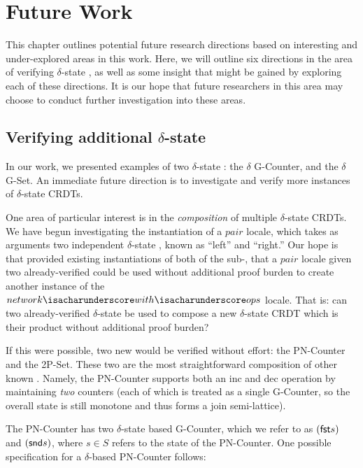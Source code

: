 \chapter{Future Work}
\label{chap:future-work}

This chapter outlines potential future research directions based on interesting
and under-explored areas in this work. Here, we will outline six directions in
the area of verifying $\delta$-state \CRDTs, as well as some insight that might
be gained by exploring each of these directions. It is our hope that future
researchers in this area may choose to conduct further investigation into these
areas.

\section{Verifying additional $\delta$-state \CRDTs}
\label{sec:future-pair-locale}
In our work, we presented examples of two $\delta$-state \CRDTs: the $\delta$
G-Counter, and the $\delta$ G-Set. An immediate future direction is to
investigate and verify more instances of $\delta$-state CRDTs.

One area of particular interest is in the \emph{composition} of multiple
$\delta$-state CRDTs. We have begun investigating the instantiation of a $pair$
locale, which takes as arguments two independent $\delta$-state \CRDTs, known as
``left'' and ``right.'' Our hope is that provided existing instantiations of
both of the sub-\CRDTs, that a $pair$ locale given two already-verified \CRDTs
could be used without additional proof burden to create another instance of the
$network{\isacharunderscore}with{\isacharunderscore}ops$ locale. That is: can
two already-verified $\delta$-state \CRDTs be used to compose a new
$\delta$-state CRDT which is their product without additional proof burden?

If this were possible, two new \CRDTs would be verified without effort: the
PN-Counter and the 2P-Set. These two \CRDTs are the most straightforward
composition of other known \CRDTs. Namely, the PN-Counter supports both an
\textsf{inc} and \textsf{dec} operation by maintaining \emph{two} counters (each
of which is treated as a single G-Counter, so the overall state is still
monotone and thus forms a join semi-lattice).

The PN-Counter has two $\delta$-state based G-Counter, which we refer to as
$(\textsf{fst} s)$ and $(\textsf{snd} s)$, where $s \in S$ refers to the state of the
PN-Counter. One possible specification for a $\delta$-based PN-Counter follows:

